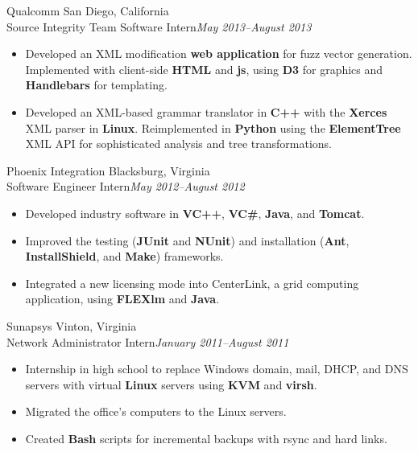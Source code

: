 \documentclass[letter]{article}
\begin{document}
\begin{minipage}{\textwidth}
\bigskip
{\large Qualcomm } \hfill San Diego, California \\
Source Integrity Team Software Intern\hfill {\it May 2013--August 2013}
\begin{itemize}
  \item Developed an XML modification {\bf web application} for fuzz vector generation. Implemented with client-side {\bf HTML} and {\bf js}, using {\bf D3} for graphics and {\bf Handlebars} for templating.
  \item Developed an XML-based grammar translator in {\bf C++} with the {\bf Xerces} XML parser in {\bf Linux}. Reimplemented in {\bf Python} using the {\bf ElementTree} XML API for sophisticated analysis and tree transformations.
\end{itemize}
\end{minipage}

\begin{minipage}{\textwidth}
\bigskip
{\large Phoenix Integration } \hfill Blacksburg, Virginia \\
Software Engineer Intern\hfill {\it May 2012--August 2012}
\begin{itemize}
  \item Developed industry software in {\bf VC++}, {\bf VC\#}, {\bf Java}, and {\bf Tomcat}.
  \item Improved the testing ({\bf JUnit} and {\bf NUnit}) and installation ({\bf Ant}, {\bf InstallShield}, and {\bf Make}) frameworks.
  \item Integrated a new licensing mode into CenterLink, a grid computing application, using {\bf FLEXlm} and {\bf Java}.
\end{itemize}
\end{minipage}

\begin{minipage}{\textwidth}
\bigskip
{\large Sunapsys } \hfill Vinton, Virginia \\
Network Administrator Intern\hfill {\it January 2011--August 2011}
\begin{itemize}
  \item Internship in high school to replace Windows domain, mail, DHCP, and DNS servers with virtual {\bf Linux} servers using {\bf KVM} and {\bf virsh}.
  \item Migrated the office's computers to the Linux servers.
  \item Created {\bf Bash} scripts for incremental backups with rsync and hard links.
\end{itemize}
\end{minipage}
\end{document}
